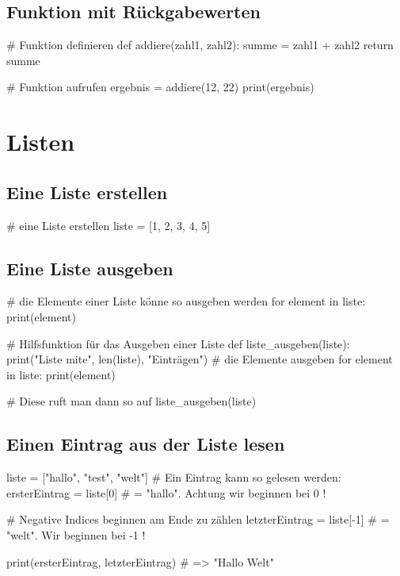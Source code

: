 \documentclass{\VorlagenPfad/coderdojokatext}
\begin{document}
\subsection{Funktion mit Rückgabewerten}
\begin{pythoncode}
# Funktion definieren
def addiere(zahl1, zahl2):
	summe = zahl1 + zahl2
	return summe

# Funktion aufrufen
ergebnis = addiere(12, 22)
print(ergebnis)
\end{pythoncode}


\section{Listen}

\subsection{Eine Liste erstellen}
\begin{pythoncode}
# eine Liste erstellen
liste = [1, 2, 3, 4, 5]
\end{pythoncode}


\subsection{Eine Liste ausgeben}
\begin{pythoncode}
	
# die Elemente einer Liste könne so ausgeben werden
for element in liste:
	print(element)
	
# Hilfsfunktion für das Ausgeben einer Liste
def liste_ausgeben(liste):	
	print("Liste mite", len(liste), "Einträgen")
	# die Elemente ausgeben
	for element in liste:
	print(element)
	
# Diese ruft man dann so auf
liste_ausgeben(liste)
\end{pythoncode}

\subsection{Einen Eintrag aus der Liste lesen}
\begin{pythoncode}
liste = ["hallo", "test", "welt"]	
# Ein Eintrag kann so gelesen werden:
ersterEintrag = liste[0] # = "hallo". Achtung wir beginnen bei 0 !

# Negative Indices beginnen am Ende zu zählen
letzterEintrag = liste[-1] # = "welt". Wir beginnen bei -1 !

print(ersterEintrag, letzterEintrag) # => "Hallo Welt"

\end{pythoncode}
\end{document}
